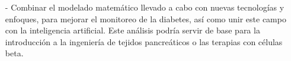 \begin{enumerate}
    \item[-] Combinar el modelado matemático llevado a cabo con nuevas tecnologías y enfoques, para mejorar el monitoreo de la diabetes, así como unir este campo con la inteligencia artificial. Este análisis podría servir de base para la introducción a la ingeniería de tejidos pancreáticos o las terapias con células beta.
\end{enumerate}